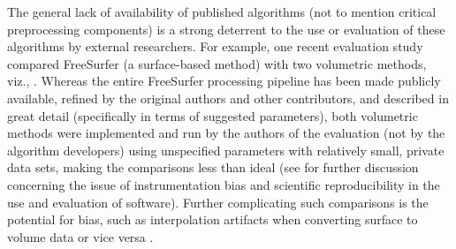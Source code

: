 


The general lack of availability of published
algorithms \citep{kovacevic2006} (not to mention critical preprocessing
components) is a strong deterrent to the use or evaluation of these algorithms
by external researchers.  For example, one recent evaluation
study \citep{clarkson2011} compared
FreeSurfer (a surface-based method) with two volumetric methods, viz., \cite{jones2000,das2009}.
Whereas the entire FreeSurfer processing pipeline has been made publicly available, 
refined by the original authors and other contributors, and described in great detail 
(specifically in terms of suggested parameters), both volumetric methods were
implemented and run by the authors of the evaluation (not by the algorithm developers)
using unspecified parameters with relatively small, private data sets,
making the comparisons less than ideal (see \cite{tustison2013} for further discussion
concerning the issue of instrumentation bias and scientific reproducibility in the use and evaluation of software).
Further complicating such comparisons is the potential for bias, such as interpolation artifacts when
converting surface to volume data or vice versa \citep{klein2010}.

